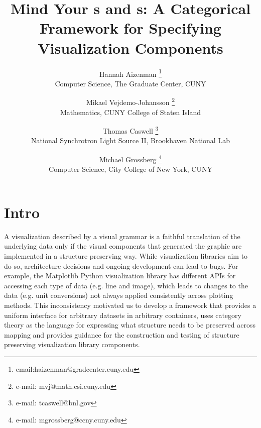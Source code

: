 \documentclass{vgtc}
\title{Mind Your \vchannel s and \vmark s: A Categorical Framework for Specifying Visualization Components}
\author{Hannah Aizenman \thanks{email:haizenman@gradcenter.cuny.edu}\\%
        \scriptsize Computer Science, The Graduate Center, CUNY
\and Mikael Vejdemo-Johansson \thanks{e-mail: mvj@math.csi.cuny.edu}\\%
        \scriptsize  Mathematics, CUNY College of Staten Island %
\and Thomas Caswell \thanks{e-mail: tcaswell@bnl.gov}\\%
  \scriptsize National Synchrotron Light Source II, Brookhaven National Lab%
\and Michael Grossberg \thanks{e-mail: mgrossberg@ccny.cuny.edu}\\%
  \scriptsize Computer Science, City College of New York, CUNY}
\begin{document}
\maketitle

\section{Intro}
\label{sec:intro}
A visualization described by a visual grammar is a faithful translation of the underlying data only if the visual components that generated the graphic are implemented in a structure preserving way. While visualization libraries aim to do so, architecture decisions and ongoing development can lead to bugs. For example, the Matplotlib Python visualization library has different APIs for accessing each type of data (e.g. line and image), which leads to changes to the data (e.g. unit conversions) not always applied consistently across plotting methods. This inconsistency motivated us to develop a framework that provides a uniform interface for arbitrary datasets in arbitrary containers, uses category theory as the language for expressing what structure needs to be preserved across mapping and provides guidance for the construction and testing of structure preserving visualization library components.
\end{document}
